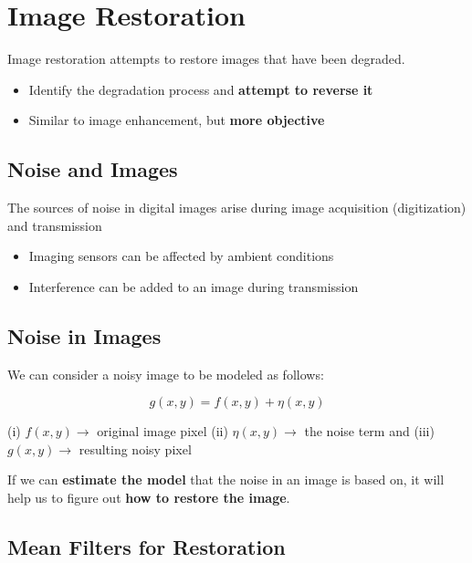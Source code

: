 \section*{Image Restoration}

Image restoration attempts to restore images that have been degraded.

\begin{itemize}
  \item Identify the degradation process and \textbf{attempt to reverse it}
  \item Similar to image enhancement, but \textbf{more objective}
\end{itemize}

\subsection*{Noise and Images}

The sources of noise in digital images arise during image acquisition
(digitization) and transmission
\begin{itemize}
  \item Imaging sensors can be affected by ambient conditions
  \item Interference can be added to an image during transmission
\end{itemize}

\subsection*{Noise in Images}

We can consider a noisy image to be modeled as follows:

\begin{equation*}
  g(x, y) = f(x, y) + \eta(x, y)
\end{equation*}

(i) $f(x, y) \rightarrow$ original image pixel (ii) $\eta(x, y)
\rightarrow$ the noise term and (iii) $g(x, y) \rightarrow$ resulting
noisy pixel

If we can \textbf{estimate the model} that the noise in an image is
based on, it will help us to figure out \textbf{how to restore the image}.

\subsection*{Mean Filters for Restoration}

